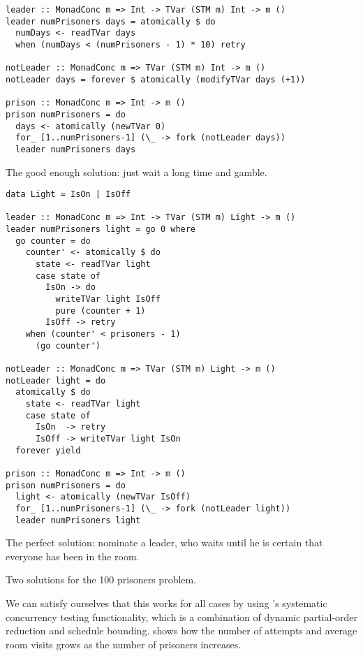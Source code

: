 \begin{listing}
\begin{sublisting}{\textwidth}
\begin{verbatim}
leader :: MonadConc m => Int -> TVar (STM m) Int -> m ()
leader numPrisoners days = atomically $ do
  numDays <- readTVar days
  when (numDays < (numPrisoners - 1) * 10) retry

notLeader :: MonadConc m => TVar (STM m) Int -> m ()
notLeader days = forever $ atomically (modifyTVar days (+1))

prison :: MonadConc m => Int -> m ()
prison numPrisoners = do
  days <- atomically (newTVar 0)
  for_ [1..numPrisoners-1] (\_ -> fork (notLeader days))
  leader numPrisoners days
\end{verbatim}
\caption{The good enough solution: just wait a long time and gamble.}\label{lst:100good}
\end{sublisting}

\vspace{2.5em}

\begin{sublisting}{\textwidth}
\begin{verbatim}
data Light = IsOn | IsOff

leader :: MonadConc m => Int -> TVar (STM m) Light -> m ()
leader numPrisoners light = go 0 where
  go counter = do
    counter' <- atomically $ do
      state <- readTVar light
      case state of
        IsOn -> do
          writeTVar light IsOff
          pure (counter + 1)
        IsOff -> retry
    when (counter' < prisoners - 1)
      (go counter')

notLeader :: MonadConc m => TVar (STM m) Light -> m ()
notLeader light = do
  atomically $ do
    state <- readTVar light
    case state of
      IsOn  -> retry
      IsOff -> writeTVar light IsOn
  forever yield

prison :: MonadConc m => Int -> m ()
prison numPrisoners = do
  light <- atomically (newTVar IsOff)
  for_ [1..numPrisoners-1] (\_ -> fork (notLeader light))
  leader numPrisoners light
\end{verbatim}
\caption{The perfect solution: nominate a leader, who waits until he is certain that everyone has been in the room.}\label{lst:100perfect}
\end{sublisting}
\caption{Two solutions for the 100 prisoners problem.}\label{lst:100sols}
\end{listing}

We can satisfy ourselves that this works for all cases by using
\dejafu{}'s systematic concurrency testing functionality, which is a
combination of dynamic partial-order reduction and schedule bounding.
 shows how the number of attempts and average room
visits grows as the number of prisoners increases.

